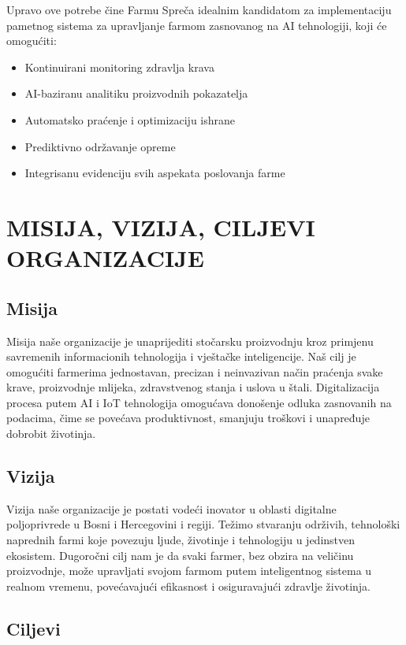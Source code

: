 \documentclass{article}
\begin{document}
Upravo ove potrebe čine Farmu Spreča idealnim kandidatom za implementaciju pametnog sistema za upravljanje farmom zasnovanog na AI tehnologiji, koji će omogućiti:

\begin{itemize}
    \item Kontinuirani monitoring zdravlja krava
    \item AI-baziranu analitiku proizvodnih pokazatelja
    \item Automatsko praćenje i optimizaciju ishrane
    \item Prediktivno održavanje opreme
    \item Integrisanu evidenciju svih aspekata poslovanja farme
\end{itemize}

\newpage
\section{MISIJA, VIZIJA, CILJEVI ORGANIZACIJE} %

\subsection{Misija}
Misija naše organizacije je unaprijediti stočarsku proizvodnju kroz primjenu savremenih informacionih tehnologija i vještačke inteligencije.
Naš cilj je omogućiti farmerima jednostavan, precizan i neinvazivan način praćenja svake krave, proizvodnje mlijeka, zdravstvenog stanja i uslova u štali.
Digitalizacija procesa putem AI i IoT tehnologija omogućava donošenje odluka zasnovanih na podacima, čime se povećava produktivnost, smanjuju troškovi i unapređuje dobrobit životinja.

\subsection{Vizija}
Vizija naše organizacije je postati vodeći inovator u oblasti digitalne poljoprivrede u Bosni i Hercegovini i regiji.
Težimo stvaranju održivih, tehnološki naprednih farmi koje povezuju ljude, životinje i tehnologiju u jedinstven ekosistem.
Dugoročni cilj nam je da svaki farmer, bez obzira na veličinu proizvodnje, može upravljati svojom farmom putem inteligentnog sistema u realnom vremenu, povećavajući efikasnost i osiguravajući zdravlje životinja.

\subsection{Ciljevi}
\end{document}
